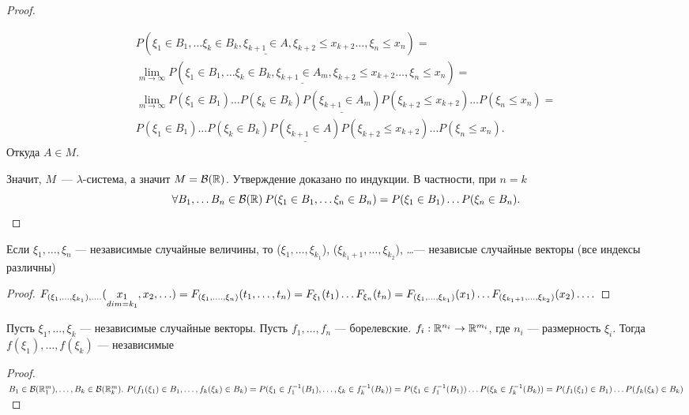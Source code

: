 \begin{theorem}
\begin{proof}
\begin{enumerate}
\begin{multline*}
     P(\xi_1 \in B_1, \ldots  \xi_k \in B_k, \underline{\xi_{k+1} \in A},\xi_{k+2} \leqslant x_{k+2} \ldots , \xi_n \leqslant x_n) =\\
     \lim_{m\to\infty} P(\xi_1 \in B_1, \ldots  \xi_k \in B_k, \underline{\xi_{k+1} \in A_m},\xi_{k+2} \leqslant x_{k+2} \ldots , \xi_n \leqslant x_n) =\\
     \lim_{m\to\infty} P(\xi_1 \in B_1) \ldots  P(\xi_k \in B_k)\underline{P(\xi_{k+1} \in A_m)}P( \xi_{k+2} \leqslant x_{k+2}) \ldots P(\xi_n \leqslant x_n) =\\
     P(\xi_1 \in B_1) \ldots  P(\xi_k \in B_k)\underline{P(\xi_{k+1} \in A)}P( \xi_{k+2} \leqslant x_{k+2}) \ldots P(\xi_n \leqslant x_n).
     \end{multline*}
     Откуда $A \in M$.
\end{enumerate}
Значит, $M$~--- $\lambda$-система, а значит $M = \mathcal{B}(\mathbb{R})$.
Утверждение доказано по индукции. В частности, при $n=k$ 
\[\forall B_1,\ldots B_n \in \mathcal{B}(\mathbb{R}) \: P(\xi_1 \in B_1, \ldots  \xi_n \in B_n) = P(\xi_1 \in B_1) \ldots  P(\xi_n \in B_n).\]
\end{proof}
\end{theorem}
\begin{lemma}
Если $\xi_1, \ldots , \xi_n$ --- независимые случайные величины, то ($\xi_1, \ldots , \xi_{k_1}$), ($\xi_{k_1 +1}, \ldots , \xi_{k_2}$), \ldots --- независые случайные векторы (все индексы различны)
\end{lemma}
\begin{proof}
$F_{(\xi_1, \ldots , \xi_{k_1}), \ldots .}(\underset{dim = k_1}{x_1}, x_2, \ldots ) = F_{(\xi_1, \ldots ., \xi_n)}(t_1, \ldots , t_n) = F_{\xi_1}(t_1) \ldots F_{\xi_n}(t_n) = \\   F_{(\xi_1,\ldots , \xi_{k_1})}(x_1)\ldots F_{(\xi_{k_1 +1}, \ldots , \xi_{k_2})}(x_2)\ldots .$
\end{proof}
\begin{theorem}
Пусть $\xi_1, \ldots , \xi_k$ --- независимые случайные векторы. Пусть $f_1, \ldots , f_n$ --- борелевские. $f_i: \mathbb{R}^{n_i} \rightarrow \mathbb{R}^{m_i}$, где $n_i$ --- размерность $\xi_i$. Тогда $f(\xi_1), \ldots , f(\xi_k)$ --- независимые
\end{theorem}

\begin{proof}
$B_1 \in \mathcal{B}(\mathbb{R}^m_1), \ldots , B_k \in \mathcal{B}(\mathbb{R}^m_k). \ P(f_1(\xi_1) \in B_1, \ldots , f_k(\xi_k) \in B_k) =  P(\xi_1 \in f_1^{-1}(B_1), \ldots , \xi_k \in f_k^{-1}(B_k)) = P(\xi_1 \in f_1^{-1}(B_1)) \ldots P( \xi_k \in f_k^{-1}(B_k)) = P(f_1(\xi_1) \in B_1) \ldots P(f_k(\xi_k) \in B_k)$
\end{proof}

